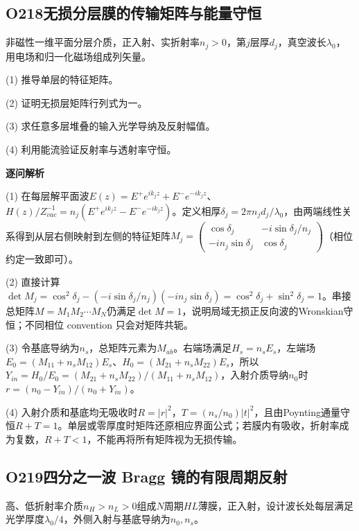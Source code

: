 
\subsection*{O218\quad 无损分层膜的传输矩阵与能量守恒}

非磁性一维平面分层介质，正入射、实折射率$n_j>0$，第$j$层厚$d_j$，真空波长$\lambda_0$，用电场和归一化磁场组成列矢量。

(1) 推导单层的特征矩阵。

(2) 证明无损层矩阵行列式为一。

(3) 求任意多层堆叠的输入光学导纳及反射幅值。

(4) 利用能流验证反射率与透射率守恒。

\par\textbf{逐问解析}

(1) 在每层解平面波$E(z)=E^+e^{ik_jz}+E^-e^{-ik_jz}$、$H(z)/Z_{vac}^{-1}=n_j(E^+e^{ik_jz}-E^-e^{-ik_jz})$。定义相厚$\delta_j=2\pi n_jd_j/\lambda_0$，由两端线性关系得到从层右侧映射到左侧的特征矩阵$M_j=\begin{pmatrix}\cos\delta_j&-i\sin\delta_j/n_j\\-in_j\sin\delta_j&\cos\delta_j\end{pmatrix}$（相位约定一致即可）。

(2) 直接计算$\det M_j=\cos^2\delta_j-(-i\sin\delta_j/n_j)(-in_j\sin\delta_j)=\cos^2\delta_j+\sin^2\delta_j=1$。串接总矩阵$M=M_1M_2\cdots M_N$仍满足$\det M=1$，说明局域无损正反向波的Wronskian守恒；不同相位 convention 只会对矩阵共轭。

(3) 令基底导纳为$n_s$，总矩阵元素为$M_{ab}$。右端场满足$H_s=n_sE_s$，左端场$E_0=(M_{11}+n_sM_{12})E_s$、$H_0=(M_{21}+n_sM_{22})E_s$，所以$Y_{in}=H_0/E_0=(M_{21}+n_sM_{22})/(M_{11}+n_sM_{12})$，入射介质导纳$n_0$时$r=(n_0-Y_{in})/(n_0+Y_{in})$。

(4) 入射介质和基底均无吸收时$R=|r|^2$，$T=(n_s/n_0)|t|^2$，且由Poynting通量守恒$R+T=1$。单层或零厚度时矩阵还原相应界面公式；若膜内有吸收，折射率成为复数，$R+T<1$，不能再将所有矩阵视为无损传输。

\par\medskip

\subsection*{O219\quad 四分之一波 Bragg 镜的有限周期反射}

高、低折射率介质$n_H>n_L>0$组成$N$周期$HL$薄膜，正入射，设计波长处每层满足光学厚度$\lambda_0/4$，外侧入射与基底导纳为$n_0,n_s$。


